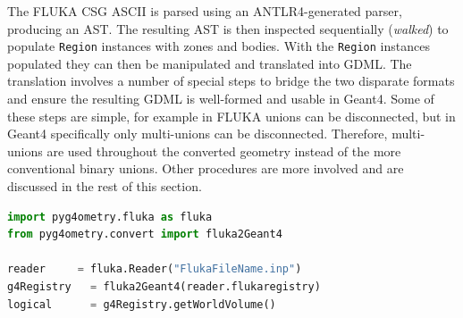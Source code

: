 \documentclass[preprint,12pt]{elsarticle}
\newcommand{\pyinline}[1]{\lstinline[postbreak={}]{#1}}
\newcommand{\PYGEOMETRY}{\textsc{Pyg4ometry}}
\begin{document}
The FLUKA CSG ASCII is parsed using an ANTLR4-generated parser,
producing an AST.  The resulting AST is then inspected sequentially
(\emph{walked}) to populate \pyinline{Region} instances with zones and bodies.
With the \pyinline{Region} instances populated they can then be manipulated
and translated into GDML.  The translation involves a number of special
steps to bridge the two disparate formats and ensure the resulting GDML is
well-formed and usable in Geant4.  Some of these steps are simple, for
example in FLUKA unions can be disconnected, but in Geant4 specifically
only multi-unions can be disconnected.  Therefore, multi-unions are used
throughout the converted geometry instead of the more conventional binary unions.
Other procedures are more involved and are discussed in the rest of this
section.

\begin{lstlisting}[caption={A simple \PYGEOMETRY{} Python script to load a
    FLUKA file and convert its geometry to a Geant4 logical volume.},label={lst:pythonFlukaLoading}, language=Python]
import pyg4ometry.fluka as fluka
from pyg4ometry.convert import fluka2Geant4

reader     = fluka.Reader("FlukaFileName.inp")
g4Registry   = fluka2Geant4(reader.flukaregistry)
logical      = g4Registry.getWorldVolume()
\end{lstlisting}
\end{document}
